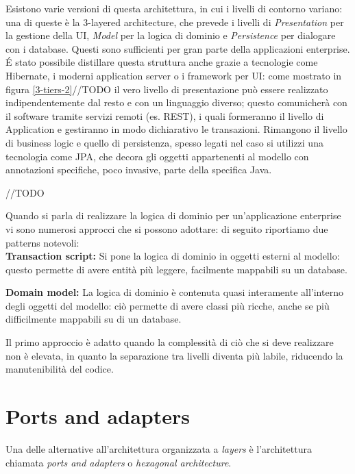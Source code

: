 Esistono varie versioni di questa architettura, in cui i livelli di contorno variano: una di queste è la 3-layered architecture, che prevede i livelli di \textit{Presentation} per la gestione della UI, \textit{Model} per la logica di dominio e \textit{Persistence} per dialogare con i database.
Questi sono sufficienti per gran parte della applicazioni enterprise.\\
\'E stato possibile distillare questa struttura anche grazie a tecnologie come Hibernate, i moderni application server o i framework per UI: come mostrato in figura \ref{3-tiers-2}//TODO il vero livello di presentazione può essere realizzato indipendentemente dal resto e con un linguaggio diverso; questo comunicherà con il software tramite servizi remoti (es. REST), i quali formeranno il livello di Application e gestiranno in modo dichiarativo le transazioni. Rimangono il livello di business logic e quello di persistenza, spesso legati nel caso si utilizzi una tecnologia come JPA, che decora gli oggetti appartenenti al modello con annotazioni specifiche, poco invasive, parte della specifica Java.


//TODO

Quando si parla di realizzare la logica di dominio per un'applicazione enterprise vi sono numerosi approcci che si possono adottare: di seguito riportiamo due patterns notevoli\cite{enterprise_app}:\\
\textbf{Transaction script:} Si pone la logica di dominio in oggetti esterni al modello: questo permette di avere entità più leggere, facilmente mappabili su un database.

\textbf{Domain model:} La logica di dominio è contenuta quasi interamente all'interno degli oggetti del modello: ciò permette di avere classi più ricche, anche se più difficilmente mappabili su di un database.

Il primo approccio è adatto quando la complessità di ciò che si deve realizzare non è elevata, in quanto la separazione tra livelli diventa più labile, riducendo la manutenibilità del codice.


\section{Ports and adapters}

Una delle alternative all'architettura organizzata a \textit{layers} è l'architettura chiamata \textit{ports and adapters} o \textit{hexagonal architecture}\cite{microservices_architecture}.

